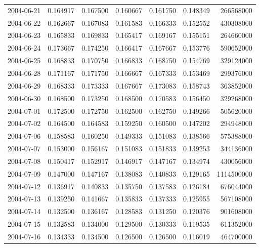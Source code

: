 \begin{tabular}{lrrrrrr}
2004-06-21 &    0.164917 &    0.167500 &    0.160667 &    0.161750 &    0.148349 &   266568000 \\
2004-06-22 &    0.162667 &    0.167083 &    0.161583 &    0.166333 &    0.152552 &   430308000 \\
2004-06-23 &    0.165833 &    0.169833 &    0.165417 &    0.169167 &    0.155151 &   264660000 \\
2004-06-24 &    0.173667 &    0.174250 &    0.166417 &    0.167667 &    0.153776 &   590652000 \\
2004-06-25 &    0.168833 &    0.170750 &    0.166833 &    0.168750 &    0.154769 &   329124000 \\
2004-06-28 &    0.171167 &    0.171750 &    0.166667 &    0.167333 &    0.153469 &   299376000 \\
2004-06-29 &    0.168333 &    0.173333 &    0.167667 &    0.173083 &    0.158743 &   363852000 \\
2004-06-30 &    0.168500 &    0.173250 &    0.168500 &    0.170583 &    0.156450 &   329268000 \\
2004-07-01 &    0.172500 &    0.172750 &    0.162500 &    0.162750 &    0.149266 &   505620000 \\
2004-07-02 &    0.164500 &    0.164583 &    0.159250 &    0.160500 &    0.147202 &   294948000 \\
2004-07-06 &    0.158583 &    0.160250 &    0.149333 &    0.151083 &    0.138566 &   575388000 \\
2004-07-07 &    0.153000 &    0.156167 &    0.151083 &    0.151833 &    0.139253 &   344136000 \\
2004-07-08 &    0.150417 &    0.152917 &    0.146917 &    0.147167 &    0.134974 &   430056000 \\
2004-07-09 &    0.147000 &    0.147167 &    0.138083 &    0.140833 &    0.129165 &  1114500000 \\
2004-07-12 &    0.136917 &    0.140833 &    0.135750 &    0.137583 &    0.126184 &   676044000 \\
2004-07-13 &    0.139250 &    0.141667 &    0.135833 &    0.137333 &    0.125955 &   567108000 \\
2004-07-14 &    0.132500 &    0.136167 &    0.128583 &    0.131250 &    0.120376 &   901608000 \\
2004-07-15 &    0.132583 &    0.134000 &    0.129500 &    0.130333 &    0.119535 &   611352000 \\
2004-07-16 &    0.134333 &    0.134500 &    0.126500 &    0.126500 &    0.116019 &   464700000 \\

\end{tabular}
